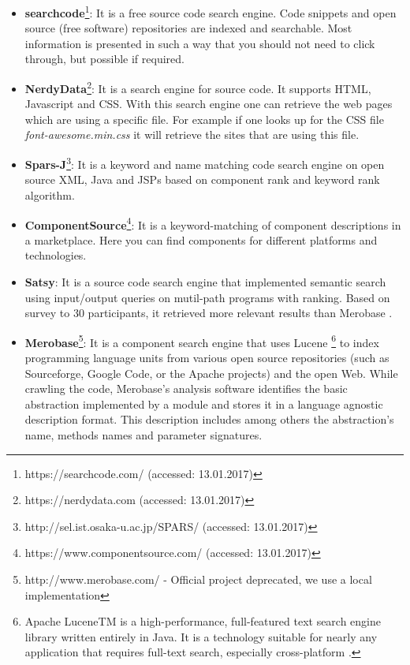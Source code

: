 \begin{itemize}
\item \textbf{searchcode}\footnote{https://searchcode.com/ (accessed: 13.01.2017)}: It is a free source code search engine. Code snippets and open source (free software) repositories are indexed and searchable. Most information is presented in such a way that you should not need to click through, but possible if required.
\item \textbf{NerdyData}\footnote{https://nerdydata.com (accessed: 13.01.2017)}: It is a search engine for source code. It supports HTML, Javascript and CSS. With this search engine one can retrieve the web pages which are using a specific file. For example if one looks up for the CSS file \textit{font-awesome.min.css} it will retrieve the sites that are using this file.
\item \textbf{Spars-J}\footnote{http://sel.ist.osaka-u.ac.jp/SPARS/ (accessed: 13.01.2017)}: It is a keyword and name matching code search engine on open source XML, Java and JSPs based on component rank and keyword rank algorithm.
\item \textbf{ComponentSource}\footnote{https://www.componentsource.com/ (accessed: 13.01.2017)}: It is a keyword-matching of component descriptions in a marketplace. Here you can find components for different platforms and technologies.
\item \textbf{Satsy}: It is a source code search engine that implemented semantic search using input/output queries on mutil-path programs with ranking. Based on survey to 30 participants, it retrieved more relevant results than Merobase \cite{Stolee2016}.
\item \textbf{Merobase}\footnote{http://www.merobase.com/ - Official project deprecated, we use a local implementation}: It is a component search engine that uses Lucene \footnote{Apache LuceneTM is a high-performance, full-featured text search engine library written entirely in Java. It is a technology suitable for nearly any application that requires full-text search, especially cross-platform \cite{lucene}.} to index programming language units from various open source repositories (such as Sourceforge, Google Code, or the Apache projects) and the open Web. While crawling the code, Merobase's analysis software identifies the basic abstraction implemented by a module and stores it in a language agnostic description format. This description includes among others the abstraction's name, methods names and parameter signatures.
\end{itemize}

